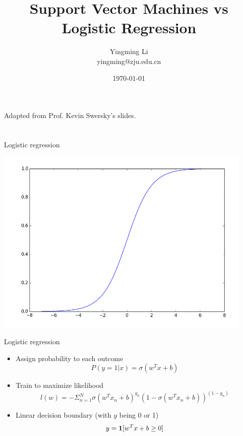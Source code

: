 \documentclass[12pt,notes,mathserif]{beamer}
\title{Support Vector Machines
vs Logistic Regression}
\author[YingmingLi]{Yingming Li \\ yingming@zju.edu.cn}
\institute[DSERC, ZJU]{Data Science \& Engineering Research Center, ZJU}
\date[\today]{\today}
\begin{document}

\begin{frame}[c]
	\titlepage
	\begin{center}
		Adapted from Prof. Kevin Swersky's slides. 
		
	\end{center}
\end{frame}

\section{}\label{section}

\begin{frame}{Logistic regression}

\begin{center}
\includegraphics[width=.9\textwidth]{2018-04-15-19-48-36.png}
\end{center}

\end{frame}

\begin{frame}{Logistic regression}

\begin{itemize}
\item
  Assign probability to each outcome \[P(y=1|x)=\sigma(w^{T}x+b)\]
\item
  Train to maximize likelihood
  \[l(w)=-\Sigma_{n=1}^{N}\sigma(w^{T}x_{n}+b)^{y_{n}}(1-\sigma(w^{T}x_{n}+b))^{(1-y_{n})}\]
\item
  Linear decision boundary (with \(y\) being \(0\) or 1)
  \[y=\mathbf{1} [w^{T}x+b\geq 0]\]
\end{itemize}

\end{frame}
\end{document}
